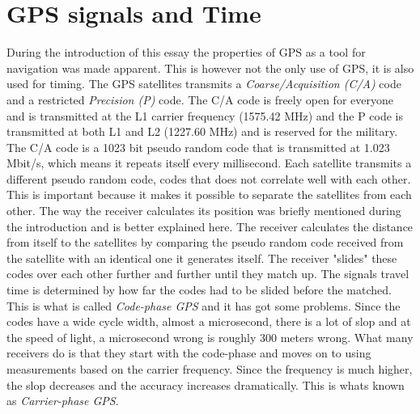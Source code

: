 \documentclass[12pt,english,a4paper]{article}
\begin{document}
\section{GPS signals and Time}\label{GST}
During the introduction of this essay the properties of GPS as a tool for navigation was made apparent. This is however not the only use of GPS, it is also used for timing. The GPS satellites transmits a \textit{Coarse/Acquisition (C/A)} code and a restricted \textit{Precision (P)} code. The C/A code is freely open for everyone and is transmitted at the L1 carrier frequency (1575.42 MHz) and the P code is transmitted at both L1 and L2 (1227.60 MHz) and is reserved for the military. The C/A code is a 1023 bit pseudo random code that is transmitted at 1.023 Mbit/s, which means it repeats itself every millisecond. Each satellite transmits a different pseudo random code, codes that does not correlate well with each other. This is important because it makes it possible to separate the satellites from each other. The way the receiver calculates its position was briefly mentioned during the introduction and is better explained here. The receiver calculates the distance from itself to the satellites by comparing the pseudo random code received from the satellite with an identical one it generates itself. The receiver "slides" these codes over each other further and further until they match up. The signals travel time is determined by how far the codes had to be slided before the matched. This is what is called \textit{Code-phase GPS} and it has got some problems. Since the codes have a wide cycle width, almost a microsecond, there is a lot of slop and at the speed of light, a microsecond wrong is roughly 300 meters wrong. What many receivers do is that they start with the code-phase and moves on to using measurements based on the carrier frequency. Since the frequency is much higher, the slop decreases and the accuracy increases dramatically. This is whats known as \textit{Carrier-phase GPS}. 
\end{document}
